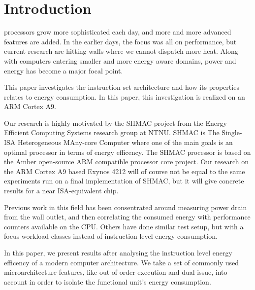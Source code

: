 \section{Introduction}

 processors grow more sophisticated each day, and more
and more advanced features are added. In the earlier days, the focus was all on
performance, but current research are hitting walls where we cannot dispatch more heat.
Along with computers entering smaller and more energy aware domains, power and
energy has become a major focal point\cite{patterson}\cite{hennessy}.

This paper investigates the instruction set architecture and how its properties
relates to energy consumption. In this paper, this investigation is realized on
an ARM Cortex A9.

Our research is highly motivated by the SHMAC project from the Energy Efficient
Computing Systems research group at NTNU. SHMAC is The Single-ISA Heterogeneous
MAny-core Computer where one of the main goals is an optimal processor in terms
of energy efficency. The SHMAC processor is based on the Amber open-source ARM
compatible processor core project. Our research on the ARM Cortex A9
based Exynos 4212 will of course not be equal to the same experiments run on
a final implementation of SHMAC, but it will give concrete results for a near
ISA-equivalent chip.

Previous work in this field has been consentrated around measuring power drain
from the wall outlet, and then correlating the consumed energy with performance
counters available on the CPU\cite{singh}\cite{bertran}\cite{bircher}. Others
have done similar test setup, but with a focus workload classes instead of
instruction level energy consumption\cite{carroll2010analysis}.

In this paper, we present results after analysing the instruction level energy
efficency of a modern computer architecture. We take a set of commonly used
microarchitecture features, like out-of-order execution and dual-issue, into
account in order to isolate the functional unit's energy consumption.


